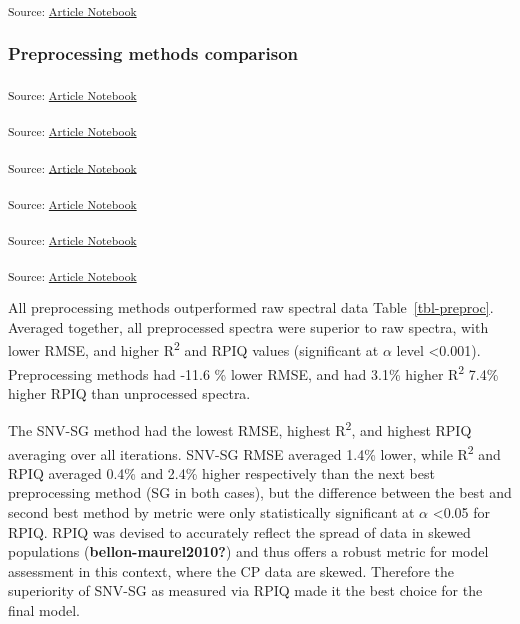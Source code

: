 \documentclass[
]{agujournal2019}
\begin{document}
\textsubscript{Source:
\href{https://rvcrawford.github.io/glowing-system/index-preview.html}{Article
Notebook}}

\subsubsection{Preprocessing methods
comparison}\label{preprocessing-methods-comparison}

\textsubscript{Source:
\href{https://rvcrawford.github.io/glowing-system/index-preview.html}{Article
Notebook}}

\textsubscript{Source:
\href{https://rvcrawford.github.io/glowing-system/index-preview.html}{Article
Notebook}}

\textsubscript{Source:
\href{https://rvcrawford.github.io/glowing-system/index-preview.html}{Article
Notebook}}

\textsubscript{Source:
\href{https://rvcrawford.github.io/glowing-system/index-preview.html}{Article
Notebook}}

\textsubscript{Source:
\href{https://rvcrawford.github.io/glowing-system/index-preview.html}{Article
Notebook}}

\textsubscript{Source:
\href{https://rvcrawford.github.io/glowing-system/index-preview.html}{Article
Notebook}}

All preprocessing methods outperformed raw spectral data
Table~\ref{tbl-preproc}. Averaged together, all preprocessed spectra
were superior to raw spectra, with lower RMSE, and higher
R\textsuperscript{2} and RPIQ values (significant at \(\alpha\) level
\textless0.001). Preprocessing methods had -11.6 \% lower RMSE, and had
3.1\% higher R\textsuperscript{2} 7.4\% higher RPIQ than unprocessed
spectra.

The SNV-SG method had the lowest RMSE, highest R\textsuperscript{2}, and
highest RPIQ averaging over all iterations. SNV-SG RMSE averaged 1.4\%
lower, while R\textsuperscript{2} and RPIQ averaged 0.4\% and 2.4\%
higher respectively than the next best preprocessing method (SG in both
cases), but the difference between the best and second best method by
metric were only statistically significant at \(\alpha\) \textless0.05
for RPIQ. RPIQ was devised to accurately reflect the spread of data in
skewed populations (\textbf{bellon-maurel2010?}) and thus offers a
robust metric for model assessment in this context, where the CP data
are skewed. Therefore the superiority of SNV-SG as measured via RPIQ
made it the best choice for the final model.
\end{document}
